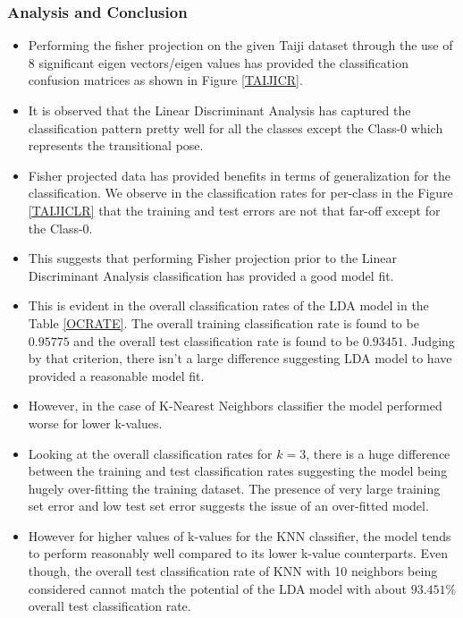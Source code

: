 \documentclass[12pt,twoside,a4paper]{article}
\begin{document}
\subsubsection{Analysis and Conclusion}
\begin{itemize}
    \item Performing the fisher projection on the given Taiji dataset through the use of 8 significant eigen vectors/eigen values has provided the classification confusion matrices as shown in Figure \ref{TAIJICR}.
    \item It is observed that the Linear Discriminant Analysis has captured the classification pattern pretty well for all the classes except the Class-0 which represents the transitional pose.
    \item Fisher projected data has provided benefits in terms of generalization for the classification. We observe in the classification rates for per-class in the Figure \ref{TAIJICLR} that the training and test errors are not that far-off except for the Class-0.
    \item This suggests that performing Fisher projection prior to the Linear Discriminant Analysis classification has provided a good model fit.
    \item This is evident in the overall classification rates of the LDA model in the Table \ref{OCRATE}. The overall training classification rate is found to be $0.95775$ and the overall test classification rate is found to be $0.93451$. Judging by that criterion, there isn't a large difference suggesting LDA model to have provided a reasonable model fit.
    \item However, in the case of K-Nearest Neighbors classifier the model performed worse for lower k-values.
    \item Looking at the overall classification rates for $k=3$, there is a huge difference between the training and test classification rates suggesting the model being hugely over-fitting the training dataset. The presence of very large training set error and low test set error suggests the issue of an over-fitted model.
    \item However for higher values of k-values for the KNN classifier, the model tends to perform reasonably well compared to its lower k-value counterparts. Even though, the overall test classification rate of KNN with 10 neighbors being considered cannot match the potential of the LDA model with about $93.451\%$ overall test classification rate.
\end{itemize}
\end{document}
